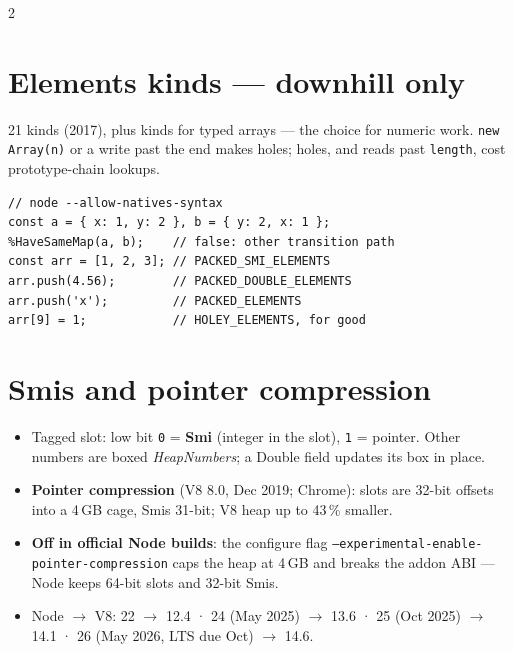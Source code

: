 \documentclass[8pt]{extarticle}
\newcommand\ct[1]{\texttt{#1}}
\begin{document}
\begin{multicols}{2}
\section{Elements kinds — downhill only}
\par
21 kinds (2017), plus kinds for typed arrays — the choice for numeric work. \ct{new Array(n)} or
a write past the end makes holes; holes, and reads past \ct{length}, cost prototype-chain
lookups.

\begin{lstlisting}[language=JSSheet, basicstyle=\ttfamily\scriptsize]
// node --allow-natives-syntax
const a = { x: 1, y: 2 }, b = { y: 2, x: 1 };
%HaveSameMap(a, b);    // false: other transition path
const arr = [1, 2, 3]; // PACKED_SMI_ELEMENTS
arr.push(4.56);        // PACKED_DOUBLE_ELEMENTS
arr.push('x');         // PACKED_ELEMENTS
arr[9] = 1;            // HOLEY_ELEMENTS, for good
\end{lstlisting}

\columnbreak

\section{Smis and pointer compression}
\begin{itemize}
  \item Tagged slot: low bit \ct{0} = \textbf{Smi} (integer in the slot), \ct{1} = pointer.
        Other numbers are boxed \emph{HeapNumbers}; a Double field updates its box in place.
  \item \textbf{Pointer compression} (V8 8.0, Dec 2019; Chrome): slots are 32-bit offsets into a
        4\,GB cage, Smis 31-bit; V8 heap up to 43\,\% smaller.
  \item \textbf{Off in official Node builds}: the configure flag
        \ct{--experimental-enable-pointer-compression} caps the heap at 4\,GB and breaks the
        addon ABI — Node keeps 64-bit slots and 32-bit Smis.
  \item Node $\to$ V8: 22 $\to$ 12.4 · 24 (May 2025) $\to$ 13.6 · 25 (Oct 2025) $\to$ 14.1 ·
        26 (May 2026, LTS due Oct) $\to$ 14.6.
\end{itemize}


\end{multicols}
\end{document}
